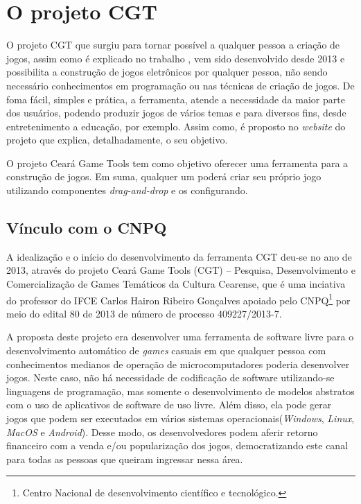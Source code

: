 \documentclass[12pt,twoside,openright,a4paper,english,brazil,sumario=tradicional]{abntex2}
\begin{document}
\section{O projeto CGT}
O projeto CGT que surgiu para tornar possível a qualquer pessoa a criação de jogos, assim como é explicado no trabalho \cite{monografia:aquino}, vem sido desenvolvido desde 2013 e possibilita a construção de jogos eletrônicos por qualquer pessoa, não sendo necessário conhecimentos em programação ou nas técnicas de criação de jogos. De foma fácil, simples e prática, a ferramenta, atende a necessidade da maior parte dos usuários, podendo produzir jogos de vários temas e para diversos fins, desde entretenimento a educação, por exemplo. Assim como, é proposto no \emph{website} do projeto que explica, detalhadamente, o seu objetivo.

\begin{citacao}
O projeto Ceará Game Tools tem como objetivo oferecer uma ferramenta para a construção de jogos. Em suma, qualquer um poderá criar seu próprio jogo utilizando componentes \emph{drag-and-drop} e os configurando. \cite{website:projeto-cgt}
\end{citacao}

\subsection{Vínculo com o CNPQ}
A idealização e o início do desenvolvimento da ferramenta CGT deu-se no ano de 2013, através do projeto Ceará Game Tools (CGT) – Pesquisa, Desenvolvimento e Comercialização de Games Temáticos da Cultura Cearense, que é uma inciativa do professor do IFCE Carlos Hairon Ribeiro Gonçalves  apoiado pelo CNPQ\footnote{Centro Nacional de desenvolvimento científico e tecnológico.} por meio do edital 80 de 2013 de número de processo 409227/2013-7.

A proposta deste projeto era desenvolver uma ferramenta de software livre para o desenvolvimento automático de \emph{games} casuais em que qualquer pessoa com conhecimentos medianos de operação de microcomputadores poderia desenvolver jogos. Neste caso, não há necessidade de codificação de software utilizando-se linguagens de programação, mas somente o desenvolvimento de modelos abstratos com o uso de aplicativos de software de uso livre. Além disso, ela pode gerar jogos que podem ser executados em vários sistemas operacionais(\emph{Windows}, \emph{Linux}, \emph{MacOS} e \emph{Android}). Desse modo, os desenvolvedores podem aferir retorno financeiro com a venda e/ou popularização dos jogos, democratizando este canal para todas as pessoas que queiram ingressar nessa área.
\end{document}
